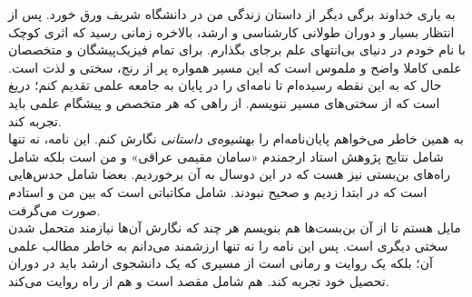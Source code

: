به یاری خداوند برگی دیگر از داستان زندگی من در دانشگاه شریف ورق خورد. پس از انتظار بسیار و دوران طولانی کارشناسی و ارشد، بالاخره زمانی رسید که اثری کوچک با نام خودم در دنیای بی‌انتهای علم برجای بگذارم. برای تمام فیزیک‌پیشگان و متخصصان علمی کاملا واضح و ملموس است که این مسیر همواره پر از رنج، سختی و لذت است. حال که به این نقطه رسیده‌ام تا نامه‌ای را در پایان به جامعه علمی تقدیم کنم؛ دریغ است که از سختی‌های مسیر ننویسم. از راهی که هر متخصص و پیشگام علمی باید تجربه کند.\\

به همین خاطر می‌خواهم پایان‌نامه‌ام را به\emph{شیوه‌ی داستانی} نگارش کنم. این نامه، نه تنها شامل نتایج پژوهش استاد ارجمندم «سامان مقیمی عراقی»  و من است بلکه شامل راه‌های بن‌بستی نیز هست که در این دوسال به آن برخوردیم. بعضا شامل حدس‌هایی است که در ابتدا زدیم و صحیح نبودند. شامل مکاتباتی است که بین من و استادم صورت می‌گرفت.\\

مایل هستم تا از آن بن‌بست‌ها هم بنویسم هر چند که نگارش آن‌ها نیازمند متحمل شدن سختی دیگری است. پس این نامه را نه تنها ارزشمند می‌دانم به خاطر مطالب علمی آن؛ بلکه یک روایت و رمانی است از مسیری که یک دانشجوی ارشد باید در دوران تحصیل خود تجربه کند. هم شامل مقصد است و هم از راه روایت می‌کند.